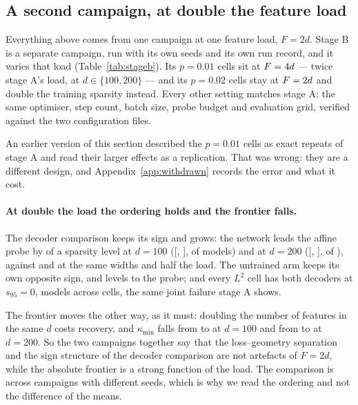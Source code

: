 \subsection{A second campaign, at double the feature load}
\label{sec:stageb}

Everything above comes from one campaign at one feature load, $F=2d$. Stage B is a separate
campaign, run with its own seeds and its own run record, and it varies that load
(Table~\ref{tab:stageb}). Its $p=0.01$ cells sit at $F=4 d$ --- twice stage A's load, at
$d\in\{100,200\}$ --- and its $p=0.02$ cells stay at $F=2 d$ and double the training
sparsity instead. Every other setting matches stage A: the same optimiser, step count, batch size,
probe budget and evaluation grid, verified against the two configuration files.

An earlier version of this section described the $p=0.01$ cells as exact repeats of stage A and read
their larger effects as a replication. That was wrong: they are a different design, and
Appendix~\ref{app:withdrawn} records the error and what it cost.

\paragraph{At double the load the ordering holds and the frontier falls.} The decoder comparison
keeps its sign and grows: the network leads the affine probe by \SbLfourHundredDiff{} of a sparsity
level at $d=100$ ([\SbLfourHundredCiLow, \SbLfourHundredCiHigh], \SbLfourHundredNetWins{} of
\SbSeeds{} models) and \SbLfourTwoHundredDiff{} at $d=200$
([\SbLfourTwoHundredCiLow, \SbLfourTwoHundredCiHigh], \SbLfourTwoHundredNetWins{} of \SbSeeds{}),
against \PrimLfourHundredPostDiff{} and \PrimLfourTwoHundredPostDiff{} at the same widths and half
the load. The untrained arm keeps its own opposite sign, \SbRandHundredDiff{} and
\SbRandTwoHundredDiff{} levels to the probe; and every $L^2$ cell has both decoders at $s_{95}=0$,
\SbLtwoJointFailures{} models across \SbLtwoCells{} cells, the same joint failure stage A shows.

The frontier moves the other way, as it must: doubling the number of features in the same $d$ costs
recovery, and $\kappa_{\min}$ falls from \FullLfourHundredKappaMin{} to \SbKappaLfourHundred{} at
$d=100$ and from \SbMatchPoneKappa{} to \SbKappaLfourTwoHundred{} at $d=200$. So the two campaigns
together say that the loss--geometry separation and the sign structure of the decoder comparison are
not artefacts of $F=2d$, while the absolute frontier is a strong function of the load. The
comparison is across campaigns with different seeds, which is why we read the ordering and not the
difference of the means.

